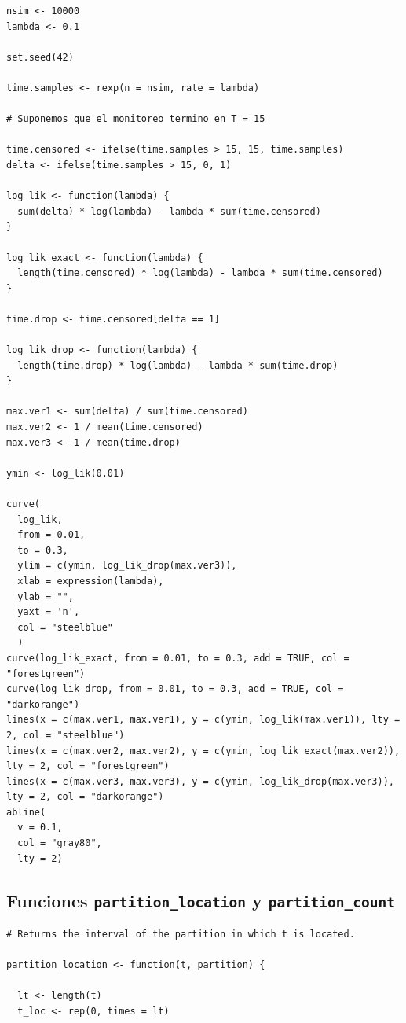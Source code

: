 \documentclass[11pt,a4paper]{article}
\begin{document}
\begin{appendices}
\begin{lstlisting}
nsim <- 10000
lambda <- 0.1

set.seed(42)

time.samples <- rexp(n = nsim, rate = lambda)

# Suponemos que el monitoreo termino en T = 15

time.censored <- ifelse(time.samples > 15, 15, time.samples)
delta <- ifelse(time.samples > 15, 0, 1)

log_lik <- function(lambda) {
  sum(delta) * log(lambda) - lambda * sum(time.censored)
}

log_lik_exact <- function(lambda) {
  length(time.censored) * log(lambda) - lambda * sum(time.censored)
}

time.drop <- time.censored[delta == 1]

log_lik_drop <- function(lambda) {
  length(time.drop) * log(lambda) - lambda * sum(time.drop)
}

max.ver1 <- sum(delta) / sum(time.censored)
max.ver2 <- 1 / mean(time.censored)
max.ver3 <- 1 / mean(time.drop)

ymin <- log_lik(0.01)

curve(
  log_lik,
  from = 0.01,
  to = 0.3,
  ylim = c(ymin, log_lik_drop(max.ver3)),
  xlab = expression(lambda),
  ylab = "",
  yaxt = 'n',
  col = "steelblue"
  )
curve(log_lik_exact, from = 0.01, to = 0.3, add = TRUE, col = "forestgreen")
curve(log_lik_drop, from = 0.01, to = 0.3, add = TRUE, col = "darkorange")
lines(x = c(max.ver1, max.ver1), y = c(ymin, log_lik(max.ver1)), lty = 2, col = "steelblue")
lines(x = c(max.ver2, max.ver2), y = c(ymin, log_lik_exact(max.ver2)), lty = 2, col = "forestgreen")
lines(x = c(max.ver3, max.ver3), y = c(ymin, log_lik_drop(max.ver3)), lty = 2, col = "darkorange")
abline(
  v = 0.1,
  col = "gray80",
  lty = 2)
\end{lstlisting}

\subsection{Funciones \texttt{partition\_location} y \texttt{partition\_count}}
\label{ap:partition_functions}

\begin{lstlisting}
# Returns the interval of the partition in which t is located.

partition_location <- function(t, partition) {

  lt <- length(t)
  t_loc <- rep(0, times = lt)


\end{lstlisting}
\end{appendices}
\end{document}
